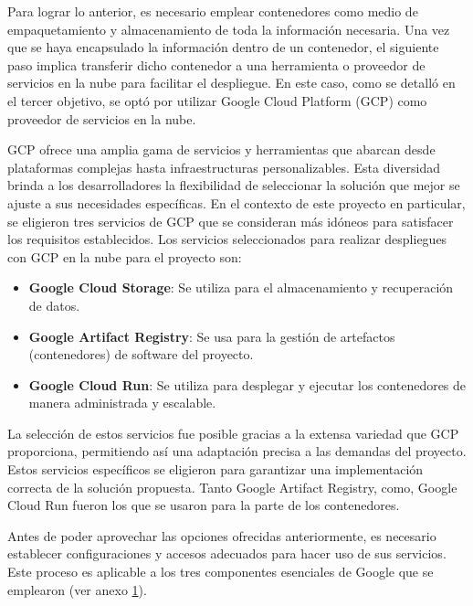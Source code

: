 Para lograr lo anterior, es necesario emplear contenedores como medio de empaquetamiento y almacenamiento de toda la información necesaria. Una vez que se haya encapsulado la información dentro de un contenedor, el siguiente paso implica transferir dicho contenedor a una herramienta o proveedor de servicios en la nube para facilitar el despliegue. En este caso, como se detalló en el tercer objetivo, se optó por utilizar Google Cloud Platform (GCP) como proveedor de servicios en la nube. \newline

\newpage

GCP ofrece una amplia gama de servicios y herramientas que abarcan desde plataformas complejas hasta infraestructuras personalizables. Esta diversidad brinda a los desarrolladores la flexibilidad de seleccionar la solución que mejor se ajuste a sus necesidades específicas. En el contexto de este proyecto en particular, se eligieron tres servicios de GCP que se consideran más idóneos para satisfacer los requisitos establecidos. Los servicios seleccionados para realizar despliegues con GCP en la nube para el proyecto son:

\begin{itemize}
	\item \textbf{Google Cloud Storage}: Se utiliza para el almacenamiento y recuperación de datos.
	\item \textbf{Google Artifact Registry}: Se usa para la gestión de artefactos (contenedores) de software del proyecto.
	\item \textbf{Google Cloud Run}: Se utiliza para desplegar y ejecutar los contenedores de manera administrada y escalable.
\end{itemize}

La selección de estos servicios fue posible gracias a la extensa variedad que GCP proporciona, permitiendo así una adaptación precisa a las demandas del proyecto. Estos servicios específicos se eligieron para garantizar una implementación correcta de la solución propuesta. Tanto Google Artifact Registry, como, Google Cloud Run fueron los que se usaron para la parte de los contenedores. \newline

Antes de poder aprovechar las opciones ofrecidas anteriormente, es necesario establecer configuraciones y accesos adecuados para hacer uso de sus servicios. Este proceso es aplicable a los tres componentes esenciales de Google que se emplearon (ver anexo \href{https://drive.google.com/file/d/1DbWHxnWBgaB8Tp3J8hLYelR91bEdglr-/view?usp=drive_link}{1}). \newline

